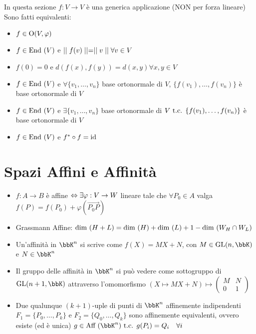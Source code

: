 \documentclass[a4paper,NoNotes,GeneralMath]{stdmdoc}
\begin{document}
	In questa sezione $f: V \rightarrow V$ è una generica applicazione (NON per forza lineare) \\
	Sono fatti equivalenti:
	\begin{itemize}
		\item $f \in \mbox{O}(V, \varphi)$
		\item $f \in \mbox{End }(V)$ e $\mid\mid f(v) \mid\mid = \mid\mid v \mid\mid \forall v \in V$
		\item $f(0)=0$ e $d(f(x), f(y)) = d(x, y) \forall x, y \in V$
		\item $f \in \mbox{End }(V)$ e $\forall \{v_1, \ldots, v_n\}$ base ortonormale di $V$, $\{f(v_1), \ldots, f(v_n)\}$ è base ortonormale di $V$
		\item $f \in \mbox{End }(V)$ e $\exists \{v_1, \ldots, v_n\}$ base ortonormale di $V \mbox{ t.c. } \{f(v_1), \ldots, f(v_n)\}$ è base ortonormale di $V$
		\item $f \in \mbox{End }(V)$ e $f^{*} \circ f = \mbox{id}$
	\end{itemize}

	\section*{Spazi Affini e Affinità}
	\begin{itemize}
		\item $f: A \rightarrow B$ è affine $\Leftrightarrow \exists \varphi: V \rightarrow W$ lineare tale che $\forall P_0 \in A$ valga $f(P) = f(P_0) + \varphi(\overrightarrow{P_0P})$
		\item Grassmann Affine: $\mbox{dim }(H+L) = \mbox{dim }(H) + \mbox{dim }(L) + 1 - \mbox{dim }(W_H \cap W_L)$
		\item Un'affinità in $\bbK^n$ si scrive come $f(X) = MX+N$, con $M \in \GL(n, \bbK)$ e $N \in \bbK^n$
		\item Il gruppo delle affinità in $\bbK^n$ si può vedere come sottogruppo di $\GL(n+1, \bbK)$ attraverso l'omomorfismo $(X \mapsto MX + N) \mapsto \left( \begin{array}{c|c} M & N \\ \hline 0 & 1 \end{array} \right)$
		\item Due qualunque $(k+1)$-uple di punti di $\bbK^n$ affinemente indipendenti $F_1=\{P_0, \ldots, P_k\}$ e $F_2 = \{Q_0, \ldots, Q_k\}$ sono affinemente equivalenti, ovvero esiste (ed è unica) $g \in \Aff(\bbK^n) \tc g(P_i) = Q_i \quad \forall i$
	\end{itemize}
\end{document}
